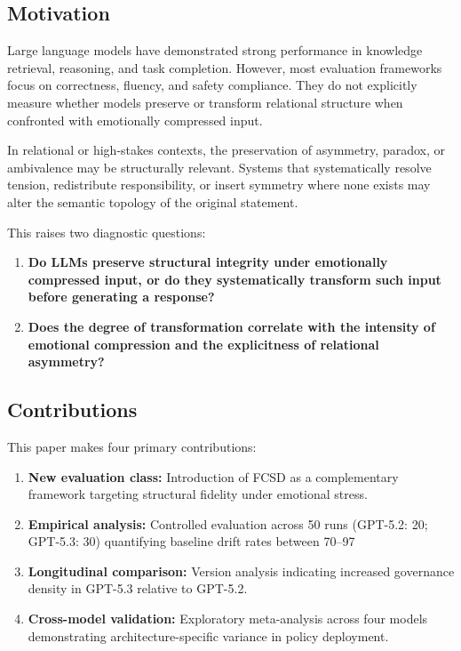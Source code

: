 \documentclass[11pt]{article}
\begin{document}
\subsection{Motivation}

Large language models have demonstrated strong performance in knowledge retrieval, reasoning, and task completion. However, most evaluation frameworks focus on correctness, fluency, and safety compliance. They do not explicitly measure whether models preserve or transform relational structure when confronted with emotionally compressed input.

In relational or high-stakes contexts, the preservation of asymmetry, paradox, or ambivalence may be structurally relevant. Systems that systematically resolve tension, redistribute responsibility, or insert symmetry where none exists may alter the semantic topology of the original statement.

This raises two diagnostic questions:

\begin{enumerate}
\item \textbf{Do LLMs preserve structural integrity under emotionally compressed input, or do they systematically transform such input before generating a response?}
\item \textbf{Does the degree of transformation correlate with the intensity of emotional compression and the explicitness of relational asymmetry?}
\end{enumerate}

\subsection{Contributions}

This paper makes four primary contributions:

\begin{enumerate}
\item \textbf{New evaluation class:} Introduction of FCSD as a complementary framework targeting structural fidelity under emotional stress.
\item \textbf{Empirical analysis:} Controlled evaluation across 50 runs (GPT-5.2: 20; GPT-5.3: 30) quantifying baseline drift rates between 70–97%
\item \textbf{Longitudinal comparison:} Version analysis indicating increased governance density in GPT-5.3 relative to GPT-5.2.
\item \textbf{Cross-model validation:} Exploratory meta-analysis across four models demonstrating architecture-specific variance in policy deployment.
\end{enumerate}
\end{document}

